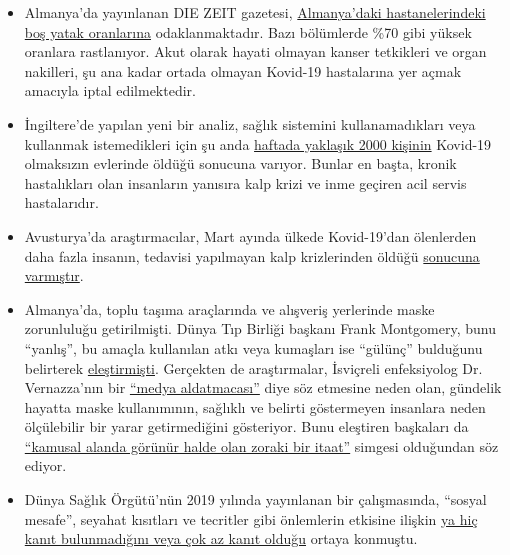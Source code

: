\begin{itemize}
\item
  Almanya'da yayınlanan DIE ZEIT gazetesi,
  \href{https://www.zeit.de/2020/18/kliniken-coronavirus-intensivbetten-patienten-behandlung-notaufnahme}{Almanya'daki
  hastanelerindeki boş yatak oranlarına} odaklanmaktadır. Bazı
  bölümlerde \%70 gibi yüksek oranlara rastlanıyor. Akut olarak hayati
  olmayan kanser tetkikleri ve organ nakilleri, şu ana kadar ortada
  olmayan Kovid-19 hastalarına yer açmak amacıyla iptal edilmektedir.
\item
  İngiltere'de yapılan yeni bir analiz, sağlık sistemini
  kullanamadıkları veya kullanmak istemedikleri için şu anda
  \href{https://www.telegraph.co.uk/global-health/science-and-disease/two-new-waves-deaths-break-nhs-new-analysis-warns/}{haftada
  yaklaşık 2000 kişinin} Kovid-19 olmaksızın evlerinde öldüğü sonucuna
  varıyor. Bunlar en başta, kronik hastalıkları olan insanların yanısıra
  kalp krizi ve inme geçiren acil servis hastalarıdır.
\item
  Avusturya'da araştırmacılar, Mart ayında ülkede Kovid-19'dan
  ölenlerden daha fazla insanın, tedavisi yapılmayan kalp krizlerinden
  öldüğü
  \href{https://academic.oup.com/eurheartj/advance-article/doi/10.1093/eurheartj/ehaa314/5820829}{sonucuna
  varmıştır}.
\item
  Almanya'da, toplu taşıma araçlarında ve alışveriş yerlerinde maske
  zorunluluğu getirilmişti. Dünya Tıp Birliği başkanı Frank Montgomery,
  bunu ``yanlış'', bu amaçla kullanılan atkı veya kumaşları ise
  ``gülünç'' bulduğunu belirterek
  \href{https://www.aerztezeitung.de/Politik/Montgomery-haelt-Maskenpflicht-fuer-falsch-408844.html}{eleştirmişti}.
  Gerçekten de araştırmalar, İsviçreli enfeksiyolog Dr. Vernazza'nın bir
  \href{https://infekt.ch/2020/04/atemschutzmasken-fuer-alle-medienhype-oder-unverzichtbar/}{``medya
  aldatmacası''} diye söz etmesine neden olan, gündelik hayatta maske
  kullanımının, sağlıklı ve belirti göstermeyen insanlara neden
  ölçülebilir bir yarar getirmediğini gösteriyor. Bunu eleştiren
  başkaları da
  \href{https://multipolar-magazin.de/artikel/maskenpflicht-gesellschaftliches-klima}{``kamusal
  alanda görünür halde olan zoraki bir itaat''} simgesi olduğundan söz
  ediyor.
\item
  Dünya Sağlık Örgütü'nün 2019 yılında yayınlanan bir çalışmasında,
  ``sosyal mesafe'', seyahat kısıtları ve tecritler gibi önlemlerin
  etkisine ilişkin
  \href{https://www.heise.de/tp/features/COVID-19-WHO-Studie-findet-kaum-Belege-fuer-die-Wirksamkeit-von-Eindaemmungsmassnahmen-4706446.html}{ya
  hiç kanıt bulunmadığını veya çok az kanıt olduğu} ortaya konmuştu.

\end{itemize}
